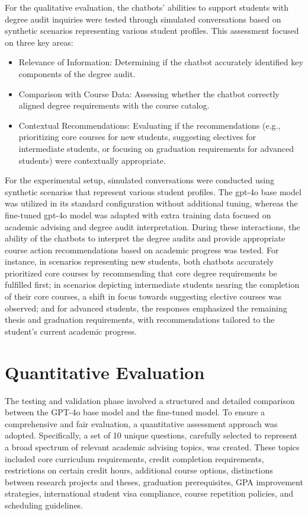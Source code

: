 \documentclass[12pt,oneside,openany]{report}
\begin{document}
For the qualitative evaluation, the chatbots’ abilities to support students with degree audit inquiries were tested through simulated conversations based on synthetic scenarios representing various student profiles. This assessment focused on three key areas:

\begin{itemize}
 \item Relevance of Information: Determining if the chatbot accurately identified key components of the degree audit.
 
 \item Comparison with Course Data: Assessing whether the chatbot correctly aligned degree requirements with the course catalog.
 \item Contextual Recommendations: Evaluating if the recommendations (e.g., prioritizing core courses for new students, suggesting electives for intermediate students, or focusing on graduation requirements for advanced students) were contextually appropriate.
\end{itemize}

For the experimental setup, simulated conversations were conducted using synthetic scenarios that represent various student profiles. The gpt-4o base model was utilized in its standard configuration without additional tuning, whereas the fine-tuned gpt-4o model was adapted with extra training data focused on academic advising and degree audit interpretation. During these interactions, the ability of the chatbots to interpret the degree audits and provide appropriate course action recommendations based on academic progress was tested. For instance, in scenarios representing new students, both chatbots accurately prioritized core courses by recommending that core degree requirements be fulfilled first; in scenarios depicting intermediate students nearing the completion of their core courses, a shift in focus towards suggesting elective courses was observed; and for advanced students, the responses emphasized the remaining thesis and graduation requirements, with recommendations tailored to the student's current academic progress.

\section{Quantitative Evaluation}

The testing and validation phase involved a structured and detailed comparison between the GPT-4o base model and the fine-tuned model. To ensure a comprehensive and fair evaluation, a quantitative assessment approach was adopted. Specifically, a set of 10 unique questions, carefully selected to represent a broad spectrum of relevant academic advising topics, was created. These topics included core curriculum requirements, credit completion requirements, restrictions on certain credit hours, additional course options, distinctions between research projects and theses, graduation prerequisites, GPA improvement strategies, international student visa compliance, course repetition policies, and scheduling guidelines.
\end{document}
